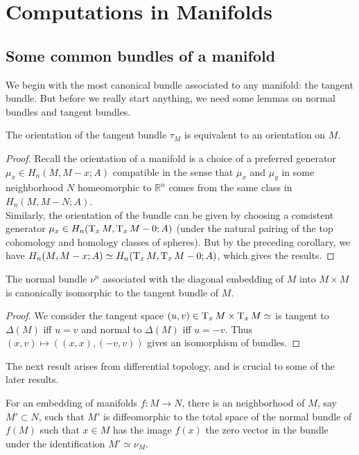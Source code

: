 \chapter{Computations in Manifolds}

\section{Some common bundles of a manifold}

	We begin with the most canonical bundle associated to any manifold: the tangent bundle. But before we really start anything, we need some lemmas on normal bundles and tangent bundles. 
	\begin{lemma}
		The orientation of the tangent bundle $\tau_M$ is equivalent to an orientation on $M$. 
	\end{lemma}
	\begin{proof}
		Recall the orientation of a manifold is a choice of a preferred generator $\mu_x\in H_n(M,M-x;A)$ compatible in the sense that $\mu_x$ and $\mu_y$ in some neighborhood $N$ homeomorphic to $\mathbb{R}^n$ comes from the same class in $H_n(M,M-N;A)$. \\
		Similarly, the orientation of the bundle can be given by choosing a consistent generator $\mu_x\in H_n(\operatorname{\mathrm{T}}_xM,\operatorname{\mathrm{T}}_xM-0;A)$ (under the natural pairing of the top cohomology and homology classes of spheres). But by the preceding corollary, we have $H_n(M,M-x;A)\simeq H_n(\operatorname{\mathrm{T}}_xM,\operatorname{\mathrm{T}}_xM-0;A)$, which gives the results. 
	\end{proof}
	\begin{lemma}
		The normal bundle $\nu^n$ associated with the diagonal embedding of $M$ into $M\times M$ is canonically isomorphic to the tangent bundle of $M$. 
	\end{lemma}
	\begin{proof}
		We consider the tangent space $(u,v)\in \operatorname{\mathrm{T}}_xM\times \operatorname{\mathrm{T}}_xM\simeq$ is tangent to $\Delta(M)$ iff $u=v$ and normal to $\Delta(M)$ iff $u=-v$. Thus $(x,v)\mapsto((x,x),(-v,v))$ gives an isomorphism of bundles. 
	\end{proof}

	The next result arises from differential topology, and is crucial to some of the later results. 
	\begin{thm}\label{Tube_Nbd}
		For an embedding of manifolds $f:M\to N$, there is an neighborhood of $M$, say $M'\subset N$, such that $M'$ is diffeomorphic to the total space of the normal bundle of $f(M)$ such that $x\in M$ has the image $f(x)$ the zero vector in the bundle under the identification $M'\simeq\nu_M$. 
	\end{thm}

